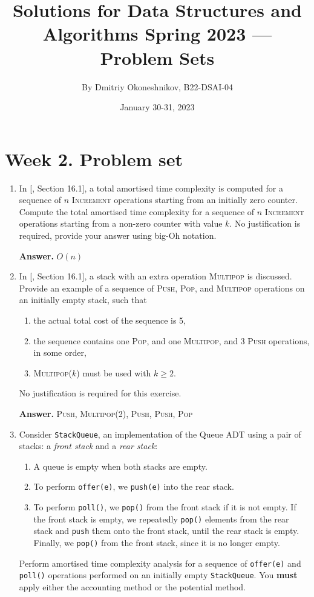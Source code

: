 \documentclass{article}
\title{Solutions for Data Structures and Algorithms Spring 2023 — Problem Sets}
\author{By Dmitriy Okoneshnikov, B22-DSAI-04}
\date{January 30-31, 2023}
\begin{document}
\maketitle

\section*{Week 2. Problem set}

\begin{enumerate}
    \item In [, Section 16.1], a total amortised time complexity is computed for a sequence of $n$ \textsc{Increment} operations starting from an initially zero counter. Compute the total amortised time complexity for a sequence of $n$ \textsc{Increment} operations starting from a non-zero counter with value $k$. No justification is required, provide your answer using big-Oh notation.

    \textbf{Answer.} $O(n)$

    \item In [, Section 16.1], a stack with an extra operation \textsc{Multipop} is discussed. Provide an example of a sequence of \textsc{Push}, \textsc{Pop}, and \textsc{Multipop} operations on an initially empty stack, such that
    \begin{enumerate}
        \item the actual total cost of the sequence is 5,
        \item the sequence contains one \textsc{Pop}, and one \textsc{Multipop}, and 3 \textsc{Push} operations, in some order,
        \item \textsc{Multipop}($k$) must be used with $k \geq 2$.
    \end{enumerate}
    No justification is required for this exercise.

    \textbf{Answer.} \textsc{Push}, \textsc{Multipop(2)}, \textsc{Push}, \textsc{Push}, \textsc{Pop}
    
    \item Consider \texttt{StackQueue}, an implementation of the Queue ADT using a pair of stacks: a \textit{front stack} and a \textit{rear stack}:
    \begin{enumerate}
        \item A queue is empty when both stacks are empty.
        \item To perform \texttt{offer(e)}, we \texttt{push(e)} into the rear stack.
        \item To perform \texttt{poll()}, we \texttt{pop()} from the front stack if it is not empty. If the front stack is empty, we repeatedly \texttt{pop()} elements from the rear stack and \texttt{push} them onto the front stack, until the rear stack is empty. Finally, we \texttt{pop()} from the front stack, since it is no longer empty.
    \end{enumerate}
    Perform amortised time complexity analysis for a sequence of \texttt{offer(e)} and \texttt{poll()} operations performed on an initially empty \texttt{StackQueue}. You \textbf{must} apply either the accounting method or the potential method.


\end{enumerate}
\end{document}
